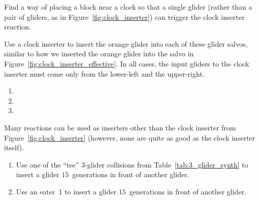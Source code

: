 \begin{multicols}{2}
	
	\mfilbreak
	
	
	\begin{problemstar}\label{exer:clock_inserter_block}
		Find a way of placing a block near a clock so that a single glider (rather than a pair of gliders, as in Figure~\ref{fig:clock_inserter}) can trigger the clock inserter reaction.
	\end{problemstar}
	
	
	\mfilbreak
	
	
	\begin{problemstar}\label{exer:clock_inserter_use}
		Use a clock inserter to insert the orange glider into each of these glider salvos, similar to how we inserted the orange glider into the salvo in Figure~\ref{fig:clock_inserter_effective}. In all cases, the input gliders to the clock inserter must come only from the lower-left and the upper-right.
		\vspace*{-0.3cm}\begin{multicols}{2}
			\begin{enumerate}[label=\bf\color{ocre}(\alph*)]
				\item[\bf\color{ocre}(a)] 
				
				\item[\bf\color{ocre}(c)] 
				
				\item[\bf\color{ocre}(b)] 
			\end{enumerate}
		\end{multicols}
	\end{problemstar}
	
	
	\mfilbreak
	
	
	\begin{problemstar}\label{exer:other_inserters}
		Many reactions can be used as inserters other than the clock inserter from Figure~\ref{fig:clock_inserter} (however, none are quite as good as the clock inserter itself).
		\begin{enumerate}[label=\bf\color{ocre}(\alph*)]
			\item Use one of the ``tee'' $3$-glider collisions from Table~\ref{tab:3_glider_synth} to insert a glider $15$~generations in front of another glider.
			
			\item Use an eater~1 to insert a glider $15$~generations in front of another glider.
			

\end{enumerate}
\end{problemstar}
\end{multicols}
